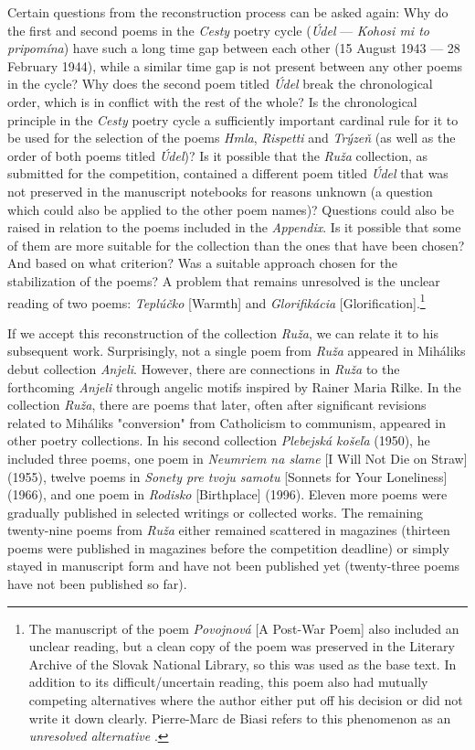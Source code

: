 \begin{paper}
Certain questions from the reconstruction process can be asked again:
Why do the first and second poems in the \emph{Cesty} poetry cycle
(\emph{Údel} –– \emph{Kohosi mi to pripomína}) have such a long time gap
between each other (15 August 1943 –– 28 February 1944), while a similar
time gap is not present between any other poems in the cycle? Why does
the second poem titled \emph{Údel} break the chronological order, which
is in conflict with the rest of the whole? Is the chronological
principle in the \emph{Cesty} poetry cycle a sufficiently important
cardinal rule for it to be used for the selection of the poems
\emph{Hmla}, \emph{Rispetti} and \emph{Trýzeň} (as well as the order of
both poems titled \emph{Údel})? Is it possible that the \emph{Ruža}
collection, as submitted for the competition, contained a different poem
titled \emph{Údel} that was not preserved in the manuscript notebooks
for reasons unknown (a question which could also be applied to the other
poem names)? Questions could also be raised in relation to the poems
included in the \emph{Appendix}. Is it possible that some of them are
more suitable for the collection than the ones that have been chosen?
And based on what criterion? Was a suitable approach chosen for the
stabilization of the poems? A problem that remains unresolved is the
unclear reading of two poems: \emph{Teplúčko} [Warmth] and
\emph{Glorifikácia} [Glorification].\footnote{The manuscript of the poem
  \emph{Povojnová} [A Post-War Poem] also included an unclear reading,
  but a clean copy of the poem was preserved in the Literary Archive of
  the Slovak National Library, so this was used as the base text. In
  addition to its difficult/uncertain reading, this poem also had
  mutually competing alternatives where the author either put off his
  decision or did not write it down clearly. Pierre-Marc de Biasi refers
  to this phenomenon as an \emph{unresolved alternative} \citep[77]{de_biasi_textova_2018}.}

If we accept this reconstruction of the collection \emph{Ruža}, we can
relate it to his subsequent work. Surprisingly, not a single poem from
\emph{Ruža} appeared in Mihálik\textquotesingle s debut collection
\emph{Anjeli}. However, there are connections in \emph{Ruža} to the
forthcoming \emph{Anjeli} through angelic motifs inspired by Rainer
Maria Rilke. In the collection \emph{Ruža}, there are poems that later,
often after significant revisions related to Mihálik\textquotesingle s
"conversion" from Catholicism to communism, appeared in other poetry
collections. In his second collection \emph{Plebejská košeľa} (1950), he
included three poems, one poem in \emph{Neumriem na slame} [I Will Not
Die on Straw] (1955), twelve poems in \emph{Sonety pre tvoju samotu}
[Sonnets for Your Loneliness] (1966), and one poem in \emph{Rodisko}
[Birthplace] (1996). Eleven more poems were gradually published in
selected writings or collected works. The remaining twenty-nine poems
from \emph{Ruža} either remained scattered in magazines (thirteen poems
were published in magazines before the competition deadline) or simply
stayed in manuscript form and have not been published yet (twenty-three
poems have not been published so far).


\end{paper}
